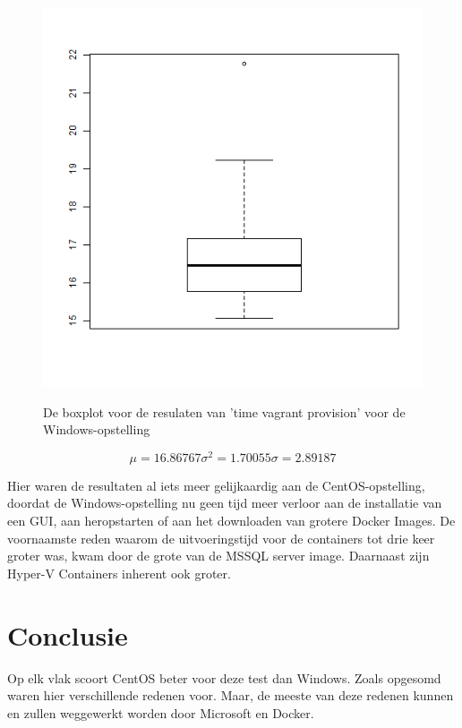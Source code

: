 \begin{figure}
	\centering
	\caption{De boxplot voor de resulaten van 'time vagrant provision' voor de Windows-opstelling}
	\includegraphics[scale=0.5]{img/WindowsProvisionboxplot.png}
	\label{fig:windowsprovisionboxplot}
\end{figure}

\[\mu = 16.86767 \sigma^2 = 1.70055 \sigma = 2.89187\]

Hier waren de resultaten al iets meer gelijkaardig aan de CentOS-opstelling, doordat de Windows-opstelling nu geen tijd meer verloor aan de installatie van een GUI, aan heropstarten of aan het downloaden van grotere Docker Images. De voornaamste reden waarom de uitvoeringstijd voor de containers tot drie keer groter was, kwam door de grote van de MSSQL server image. Daarnaast zijn Hyper-V Containers inherent ook groter.

\section{Conclusie}
Op elk vlak scoort CentOS beter voor deze test dan Windows. Zoals opgesomd waren hier verschillende redenen voor. Maar, de meeste van deze redenen kunnen en zullen weggewerkt worden door Microsoft en Docker.